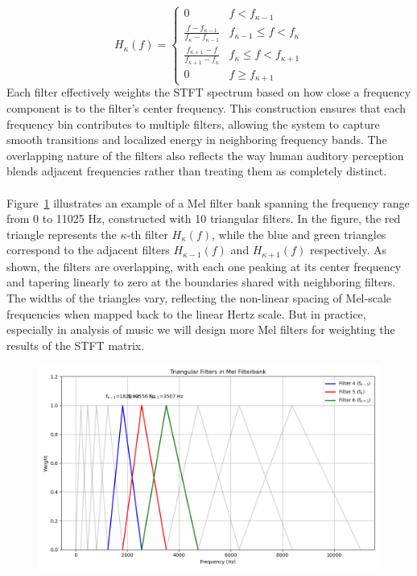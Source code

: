 \begin{equation}
H_{\kappa}(f)=
\begin{cases}
	0  & f<f_{\kappa-1}\\
	\frac{f-f_{\kappa-1}}{f_{\kappa}-f_{\kappa-1}}  & f_{\kappa-1}\leq f<f_{\kappa} \\
	\frac{f_{\kappa+1}-f}{f_{\kappa+1}-f_{\kappa}}  & f_{\kappa}\leq f<f_{\kappa+1} \\
	0  & f \geq f_{\kappa+1}
\end{cases}	
\end{equation}
Each filter effectively weights the STFT spectrum based on how close a frequency component is to the filter's center frequency. This construction ensures that each frequency bin contributes to multiple filters, allowing the system to capture smooth transitions and localized energy in neighboring frequency bands. The overlapping nature of the filters also reflects the way human auditory perception blends adjacent frequencies rather than treating them as completely distinct.\\
\\
Figure~\ref{fig:Mel filters} illustrates an example of a Mel filter bank spanning the frequency range from 0 to 11025 Hz, constructed with 10 triangular filters. In the figure, the red triangle represents the $\kappa$-th filter $H_{\kappa}(f)$, while the blue and green triangles correspond to the adjacent filters $H_{\kappa-1}(f)$ and $H_{\kappa+1}(f)$ respectively. As shown, the filters are overlapping, with each one peaking at its center frequency and tapering linearly to zero at the boundaries shared with neighboring filters. The widths of the triangles vary, reflecting the non-linear spacing of Mel-scale frequencies when mapped back to the linear Hertz scale. But in practice, especially in analysis of music we will design more Mel filters for weighting the results of the STFT matrix.\\
\begin{figure}
	\centering
	\includegraphics[width=0.9\linewidth]{../Statistical_Sciences_template/figure/example of Mel filters.png}
	\caption{}
	\label{fig:Mel filters}
\end{figure}\\
